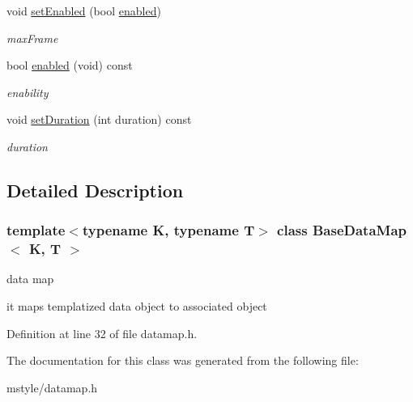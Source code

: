\begin{DoxyCompactItemize}
\mbox{\label{class_base_data_map_a743f9914b53c083d4f187e815928bed0}} 
void \hyperlink{class_base_data_map_a743f9914b53c083d4f187e815928bed0}{set\+Enabled} (bool \hyperlink{class_base_data_map_aff5bcfb516d51bbbcd3ba30ea535b3ca}{enabled})
\begin{DoxyCompactList}\small\item\em max\+Frame \end{DoxyCompactList}\item 
\mbox{\label{class_base_data_map_aff5bcfb516d51bbbcd3ba30ea535b3ca}} 
bool \hyperlink{class_base_data_map_aff5bcfb516d51bbbcd3ba30ea535b3ca}{enabled} (void) const
\begin{DoxyCompactList}\small\item\em enability \end{DoxyCompactList}\item 
\mbox{\label{class_base_data_map_a6c4e673ddbe44add402a6ecf2fb266b1}} 
void \hyperlink{class_base_data_map_a6c4e673ddbe44add402a6ecf2fb266b1}{set\+Duration} (int duration) const
\begin{DoxyCompactList}\small\item\em duration \end{DoxyCompactList}\end{DoxyCompactItemize}


\subsection{Detailed Description}
\subsubsection*{template$<$typename K, typename T$>$\newline
class Base\+Data\+Map$<$ K, T $>$}

data map 

it maps templatized data object to associated object 

Definition at line 32 of file datamap.\+h.



The documentation for this class was generated from the following file\+:\begin{DoxyCompactItemize}
\item 
mstyle/datamap.\+h\end{DoxyCompactItemize}
